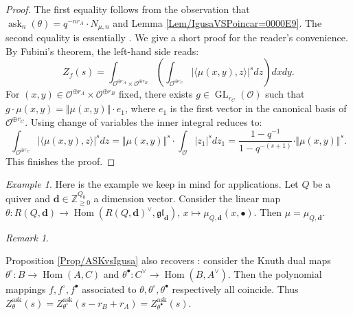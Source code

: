 \documentclass[11pt,english]{article}
\numberwithin{equation}{section}
\numberwithin{figure}{section}
\theoremstyle{definition}
\theoremstyle{plain}
\theoremstyle{remark}
\newtheorem{exmp}[df]{Example}
\newtheorem{rmk}[df]{Remark}
\DeclareMathOperator{\Hom}{Hom}
\DeclareMathOperator{\GL}{GL}
\DeclareMathOperator{\ask}{ask}
\newcommand\dd{\mathbf{d}}
\newcommand\ZZ{\mathbb{Z}}
\begin{document}
\begin{proof}

The first equality follows from the observation that $\ask_{n}(\theta)=q^{-nr_{A}}\cdot N_{\mu,n}$
and Lemma \ref{Lem/IgusaVSPoincar=0000E9}. The second equality is
essentially \cite[Thm. 1.4.]{Mus22a}. We give a short proof for the
reader's convenience. By Fubini's theorem, the left-hand side reads:\[
Z_f(s)=\int_{\mathcal{O}^{\oplus r_A}\times\mathcal{O}^{\oplus r_B}}\left(\int_{\mathcal{O}^{\oplus r_C}}\vert\langle\mu(x,y),z\rangle\vert^s dz \right) dxdy.
\]For $(x,y)\in\mathcal{O}^{\oplus r_{A}}\times\mathcal{O}^{\oplus r_{B}}$
fixed, there exists $g\in\GL_{r_{C}}(\mathcal{O})$ such that $g\cdot\mu(x,y)=\Vert\mu(x,y)\Vert\cdot e_{1}$,
where $e_{1}$ is the first vector in the canonical basis of $\mathcal{O}^{\oplus r_{C}}$.
Using change of variables the inner integral reduces to:\[
\int_{\mathcal{O}^{\oplus r_C}}\vert\langle\mu(x,y),z\rangle\vert^s dz=\Vert\mu(x,y)\Vert^s\cdot\int_{\mathcal{O}}\vert z_1\vert^s dz_1=\frac{1-q^{-1}}{1-q^{-(s+1)}}\cdot\Vert\mu(x,y)\Vert^s.
\]This finishes the proof. \end{proof}

\begin{exmp}

Here is the example we keep in mind for applications. Let $Q$ be
a quiver and $\dd\in\ZZ_{\geq0}^{Q_{0}}$ a dimension vector. Consider
the linear map $\theta:R(Q,\dd)\rightarrow\Hom(R(Q,\dd)^{\vee},\mathfrak{gl}_{\dd})$,
$x\mapsto\mu_{Q,\dd}(x,\bullet)$. Then $\mu=\mu_{Q,\dd}$.

\end{exmp}

\begin{rmk} \label{Rmk/KnuthDuals}

Proposition \ref{Prop/ASKvsIgusa} also recovers \cite[Cor. 5.6.]{Ros20}:
consider the Knuth dual maps $\theta^{\circ}:B\rightarrow\Hom(A,C)$
and $\theta^{\bullet}:C^{\vee}\rightarrow\Hom(B,A^{\vee})$. Then
the polynomial mappings $f,f^{\circ},f^{\bullet}$ associated to $\theta,\theta^{\circ},\theta^{\bullet}$
respectively all coincide. Thus $Z_{\theta}^{\ask}(s)=Z_{\theta^{\circ}}^{\ask}(s-r_{B}+r_{A})=Z_{\theta^{\bullet}}^{\ask}(s)$.

\end{rmk}
\end{document}

